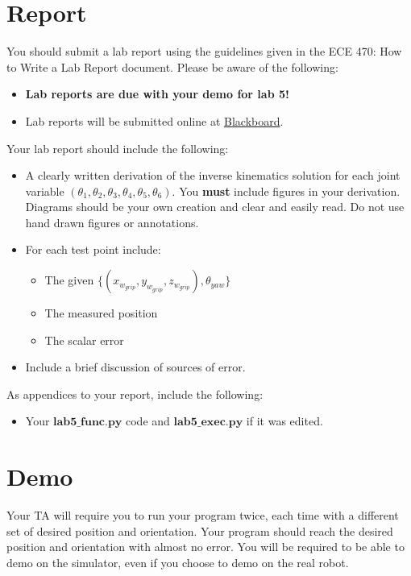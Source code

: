\section{Report}
You should submit a lab report using the guidelines given in the ECE 470: How to Write a Lab Report document.  Please be aware of the following:
\begin{itemize}
    \item \textbf{Lab reports are due with your demo for lab 5!}
    \item Lab reports will be submitted online at \href{https://learn.intl.zju.edu.cn/}{Blackboard}.
\end{itemize}
Your lab report should include the following:
\begin{itemize}
    \item A clearly written derivation of the inverse kinematics solution for each joint variable $\left(\theta_{1},\theta_{2},\theta_{3},\theta_{4},\theta_{5},\theta_{6}\right)$. You \textbf{must} include figures in your derivation. Diagrams should be your own creation and clear and easily read.  Do not use hand drawn figures or annotations.
\item For each test point include:
    \begin{itemize}
        \item The given $\{\left(x_{w_{grip}}, y_{w_{grip}},z_{w_{grip}}\right),\theta_{yaw}\}$
        \item The measured position
        \item The scalar error
    \end{itemize}
\item Include a brief discussion of sources of error.

\end{itemize}

As appendices to your report, include the following:
\begin{itemize}
    \item Your $\textbf{lab5\_func.py}$ code and $\textbf{lab5\_exec.py}$ if it was edited.
\end{itemize}

\section{Demo}
Your TA will require you to run your program twice, each time with a different set of desired position and orientation. Your program should reach the desired position and orientation with almost no error. You will be required to be able to demo on the simulator, even if you choose to demo on the real robot.

